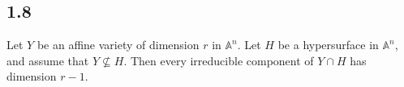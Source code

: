     \subsection*{1.8}
    Let $Y$ be an affine variety of dimension $r$ in $\mathbb{A}^n$.  Let $H$ be a hypersurface in $\mathbb{A}^n$, and assume that $Y \not\subseteq H$.  Then every irreducible component of $Y \cap H$ has dimension $r-1$.
